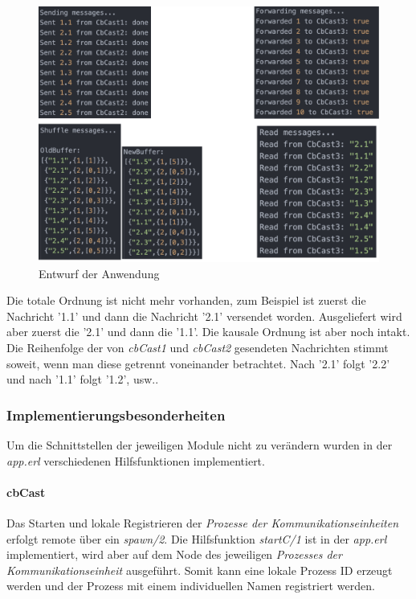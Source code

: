 \begin{figure}[htbp]
\begin{center}
\includegraphics[scale=0.3]{Latex/Bilder/app_log.001.png}
\caption{\label{logs_anwendung} Entwurf der Anwendung}
\end{center}
\end{figure}

Die totale Ordnung ist nicht mehr vorhanden, zum Beispiel ist zuerst die Nachricht '1.1' und dann die Nachricht '2.1' versendet worden. Ausgeliefert wird aber zuerst die '2.1' und dann die '1.1'. Die kausale Ordnung ist aber noch intakt. Die Reihenfolge der von \textit{cbCast1} und \textit{cbCast2} gesendeten Nachrichten stimmt soweit, wenn man diese getrennt voneinander betrachtet. Nach '2.1' folgt '2.2' und nach '1.1' folgt '1.2', usw.. 

\subsubsection{Implementierungsbesonderheiten}

Um die Schnittstellen der jeweiligen Module nicht zu verändern wurden in der \textit{app.erl} verschiedenen Hilfsfunktionen implementiert. 

\paragraph{cbCast}

Das Starten und lokale Registrieren der \textit{Prozesse der Kommunikationseinheiten} erfolgt remote über ein \textit{spawn/2}. Die Hilfsfunktion \textit{startC/1} ist in der \textit{app.erl} implementiert, wird aber auf dem Node des jeweiligen \textit{Prozesses der Kommunikationseinheit} ausgeführt. Somit kann eine lokale Prozess ID erzeugt werden und der Prozess mit einem individuellen Namen registriert werden.

